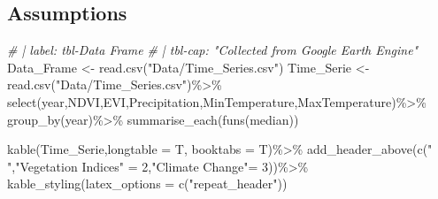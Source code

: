 \documentclass[
  onepage,
  openany]{scrbook}
\newenvironment{Shaded}{}{}
\newcommand{\AttributeTok}[1]{\textcolor[rgb]{0.49,0.56,0.16}{#1}}
\newcommand{\CommentTok}[1]{\textcolor[rgb]{0.38,0.63,0.69}{\textit{#1}}}
\newcommand{\DecValTok}[1]{\textcolor[rgb]{0.25,0.63,0.44}{#1}}
\newcommand{\FunctionTok}[1]{\textcolor[rgb]{0.02,0.16,0.49}{#1}}
\newcommand{\NormalTok}[1]{#1}
\newcommand{\OtherTok}[1]{\textcolor[rgb]{0.00,0.44,0.13}{#1}}
\newcommand{\SpecialCharTok}[1]{\textcolor[rgb]{0.25,0.44,0.63}{#1}}
\newcommand{\StringTok}[1]{\textcolor[rgb]{0.25,0.44,0.63}{#1}}
\begin{document}
\hypertarget{assumptions}{%
\subsection{Assumptions}\label{assumptions}}

\begin{Shaded}
\begin{Highlighting}[]
\CommentTok{\# | label: tbl{-}Data Frame}
\CommentTok{\# | tbl{-}cap: "Collected from Google Earth Engine"}
\NormalTok{Data\_Frame }\OtherTok{\textless{}{-}} \FunctionTok{read.csv}\NormalTok{(}\StringTok{"Data/Time\_Series.csv"}\NormalTok{)}
\NormalTok{Time\_Serie }\OtherTok{\textless{}{-}} \FunctionTok{read.csv}\NormalTok{(}\StringTok{"Data/Time\_Series.csv"}\NormalTok{)}\SpecialCharTok{\%\textgreater{}\%}
  \FunctionTok{select}\NormalTok{(year,NDVI,EVI,Precipitation,MinTemperature,MaxTemperature)}\SpecialCharTok{\%\textgreater{}\%}
  \FunctionTok{group\_by}\NormalTok{(year)}\SpecialCharTok{\%\textgreater{}\%}
  \FunctionTok{summarise\_each}\NormalTok{(}\FunctionTok{funs}\NormalTok{(median))}

\FunctionTok{kable}\NormalTok{(Time\_Serie,}\AttributeTok{longtable =}\NormalTok{ T, }\AttributeTok{booktabs =}\NormalTok{ T)}\SpecialCharTok{\%\textgreater{}\%}
\FunctionTok{add\_header\_above}\NormalTok{(}\FunctionTok{c}\NormalTok{(}\StringTok{" "}\NormalTok{,}\StringTok{"Vegetation Indices"} \OtherTok{=} \DecValTok{2}\NormalTok{,}\StringTok{"Climate Change"}\OtherTok{=} \DecValTok{3}\NormalTok{))}\SpecialCharTok{\%\textgreater{}\%}
  \FunctionTok{kable\_styling}\NormalTok{(}\AttributeTok{latex\_options =} \FunctionTok{c}\NormalTok{(}\StringTok{"repeat\_header"}\NormalTok{))}
\end{Highlighting}
\end{Shaded}
\end{document}
